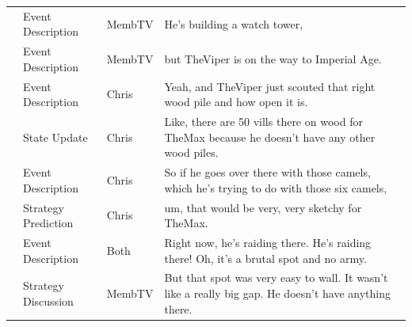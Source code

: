 {\begin{longtable}{@{}>{\theAppRow}r|L{2.3cm}L{1.0cm}U{11.55cm}@{}}
    & Event Description     & MembTV       & He's building a watch tower,                                                                                                                                                                                                                                     \\
    & Event Description     & MembTV       & but TheViper is on the way to Imperial Age.                                                                                                                                                                                                                      \\
    & Event Description     & Chris        & Yeah, and TheViper just scouted that right wood pile and how open it is.                                                                                                                                                                                         \\
    & State Update          & Chris        & Like, there are 50 vills there on wood for TheMax because he doesn't have any other wood piles.                                                                                                                                                                  \\
    & Event Description     & Chris        & So if he goes over there with those camels, which he's trying to do with those six camels,                                                                                                                                                                       \\
    & Strategy Prediction   & Chris        & um, that would be very, very sketchy for TheMax.                                                                                                                                                                                                                 \\
    & Event Description     & Both         & Right now, he's raiding there. He's raiding there! Oh, it's a brutal spot and no army.                                                                                                                                                                           \\
    & Strategy Discussion   & MembTV       & But that spot was very easy to wall. It wasn't like a really big gap. He doesn't have anything there.                                                                                                                                                            \\

\end{longtable}}
